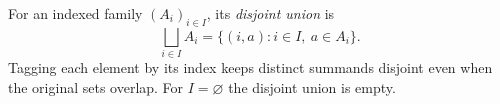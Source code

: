 
For an indexed family $(A_i)_{i\in I}$, its \emph{disjoint union} is
\[
\bigsqcup_{i\in I}A_i=\{(i,a):i\in I,\ a\in A_i\}.
\]
Tagging each element by its index keeps distinct summands disjoint even when the original sets overlap. For $I=\varnothing$ the disjoint union is empty.
